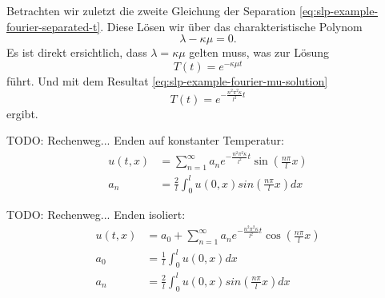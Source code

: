 Betrachten wir zuletzt die zweite Gleichung der Separation
\eqref{eq:slp-example-fourier-separated-t}.
Diese Lösen wir über das charakteristische Polynom
\[
    \lambda - \kappa \mu
    =
    0.
\]
Es ist direkt ersichtlich, dass $\lambda = \kappa \mu$ gelten muss, was zur
Lösung
\[
    T(t)
    =
    e^{-\kappa \mu t}
\]
führt.
Und mit dem Resultat \eqref{eq:slp-example-fourier-mu-solution}
\[
    T(t)
    =
    e^{-\frac{n^{2}\pi^{2}\kappa}{l^{2}}t}
\]
ergibt.

TODO: Rechenweg... Enden auf konstanter Temperatur:
\[
\begin{aligned}
    u(t,x)
    &=
    \sum_{n=1}^{\infty}a_{n}e^{-\frac{n^{2}\pi^{2}\kappa}{l^{2}}t}
    \sin\left(\frac{n\pi}{l}x\right)
    \\
    a_{n}
    &=
    \frac{2}{l}\int_{0}^{l}u(0,x)sin\left(\frac{n\pi}{l}x\right) dx
\end{aligned}
\]

TODO: Rechenweg... Enden isoliert:
\[
\begin{aligned}
    u(t,x)
    &=
    a_{0} + \sum_{n=1}^{\infty}a_{n}e^{-\frac{n^{2}\pi^{2}\kappa}{l^{2}}t}
    \cos\left(\frac{n\pi}{l}x\right)
    \\
    a_{0}
    &=
    \frac{1}{l}\int_{0}^{l}u(0,x) dx
    \\
    a_{n}
    &=
    \frac{2}{l}\int_{0}^{l}u(0,x)sin\left(\frac{n\pi}{l}x\right) dx
\end{aligned}
\]
